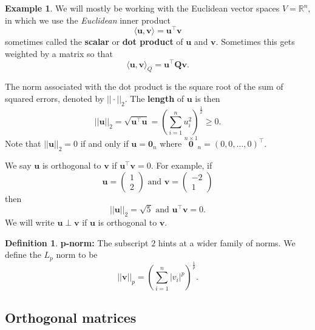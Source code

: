\documentclass[]{book}
\theoremstyle{definition}
\newtheorem{definition}{Definition}[chapter]
\theoremstyle{definition}
\newtheorem{example}{Example}[chapter]
\theoremstyle{definition}
\theoremstyle{remark}
\begin{document}
\begin{example}
\protect\hypertarget{exm:Rp3}{}{\label{exm:Rp3} }We will mostly be working with the Euclidean vector spaces \(V=\mathbb{R}^n\), in which we use the \emph{Euclidean} inner product
\[\langle \mathbf u, \mathbf v\rangle = \mathbf u^\top \mathbf v\]
sometimes called the \textbf{scalar} or \textbf{dot product} of \(\mathbf u\) and \(\mathbf v\). Sometimes this gets weighted by a matrix so that
\[\langle \mathbf u, \mathbf v\rangle_Q = \mathbf u^\top \mathbf Q\mathbf v.\]

The norm associated with the dot product is the square root of the sum of squared errors, denoted by \(|| \cdot ||_2\).
The \textbf{length} of \(\mathbf u\) is then
\[||\mathbf u||_2=\sqrt{\mathbf u^\top \mathbf u} =\left( \sum_{i=1}^n u_i^2\right)^\frac{1}{2}\geq 0.\]
Note that \(||\mathbf u||_2=0\) if and only if \(\mathbf u={\mathbf 0}_n\) where \(\stackrel{n\times 1}{\mathbf 0}_n=(0,0,\dots ,0)^\top\).

We say \(\mathbf u\) is orthogonal to \(\mathbf v\) if \(\mathbf u^\top \mathbf v=0\).
For example, if
\[\mathbf u=\left(\begin{array}{c}1\\2\end{array}\right) \mbox{ and } \mathbf v=\left(\begin{array}{c}-2\\1\end{array}\right)\]
then
\[||\mathbf u||_2 = \sqrt{5}\mbox{ and } \mathbf u^\top \mathbf v=0.\]
We will write \(\mathbf u\perp \mathbf v\) if \(\mathbf u\) is orthogonal to \(\mathbf v\).
\end{example}

\begin{definition}
\protect\hypertarget{def:pnorms}{}{\label{def:pnorms} }\textbf{p-norm:} The subscript \(2\) hints at a wider family of norms. We define the \(L_p\) norm to be
\[|| \mathbf v||_p = \left(\sum_{i=1}^n |v_i|^p\right)^\frac{1}{p}.\]
\end{definition}

\hypertarget{orthogonal-matrices}{%
\subsection{Orthogonal matrices}\label{orthogonal-matrices}}
\end{document}
